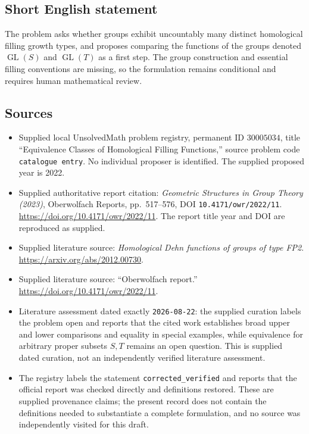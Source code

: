 \documentclass[11pt]{article}
\begin{document}
\subsection{Short English statement}
The problem asks whether groups exhibit uncountably many distinct homological filling growth types, and proposes comparing the functions of the groups denoted \(\operatorname{GL}(S)\) and \(\operatorname{GL}(T)\) as a first step. The group construction and essential filling conventions are missing, so the formulation remains conditional and requires human mathematical review.
\subsection{Sources}
\begin{itemize}
\item Supplied local UnsolvedMath problem registry, permanent ID \(30005034\), title ``Equivalence Classes of Homological Filling Functions,'' source problem code \texttt{catalogue entry}. No individual proposer is identified. The supplied proposed year is 2022.
\item Supplied authoritative report citation: \emph{Geometric Structures in Group Theory (2023)}, Oberwolfach Reports, pp.\ 517--576, DOI \texttt{10.4171/owr/2022/11}. \url{https://doi.org/10.4171/owr/2022/11}. The report title year and DOI are reproduced as supplied.
\item Supplied literature source: \emph{Homological Dehn functions of groups of type FP2}. \url{https://arxiv.org/abs/2012.00730}.
\item Supplied literature source: ``Oberwolfach report.'' \url{https://doi.org/10.4171/owr/2022/11}.
\item Literature assessment dated exactly \texttt{2026-08-22}: the supplied curation labels the problem open and reports that the cited work establishes broad upper and lower comparisons and equality in special examples, while equivalence for arbitrary proper subsets \(S,T\) remains an open question. This is supplied dated curation, not an independently verified literature assessment.
\item The registry labels the statement \texttt{corrected\_verified} and reports that the official report was checked directly and definitions restored. These are supplied provenance claims; the present record does not contain the definitions needed to substantiate a complete formulation, and no source was independently visited for this draft.
\end{itemize}
\end{document}
